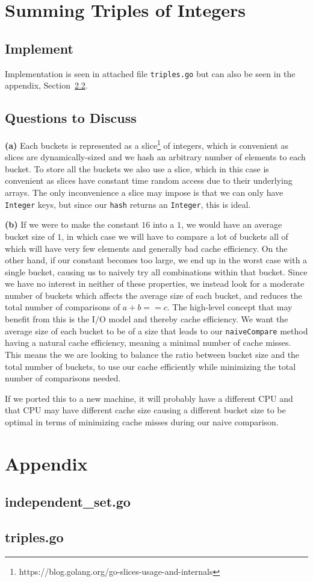 \documentclass[a5paper]{article}
\begin{document}
\section{Summing Triples of Integers}
\subsection{Implement}
Implementation is seen in attached file \texttt{triples.go} but can also be seen in the appendix, Section~\ref{sec:triples}.

\subsection{Questions to Discuss}
\textbf{(a)}
Each buckets is represented as a slice\footnote{https://blog.golang.org/go-slices-usage-and-internals} of integers, which is convenient as slices
are dynamically-sized and we hash an arbitrary number of elements to each bucket. To store all the buckets we also use a slice,
which in this case is convenient as slices have constant time random access due to their underlying arrays. The only inconvenience a slice may impose
is that we can only have \texttt{Integer} keys, but since our \texttt{hash} returns an \texttt{Integer}, this is ideal.

\textbf{(b)}
If we were to make the constant $16$ into a $1$, we would have an average bucket size of $1$, in which case we will have to compare a lot of buckets all of which will have very few elements and generally bad cache efficiency. On the other hand, if our constant becomes too large, we end up in the worst case with a single bucket, causing us to naively try all combinations within that bucket. Since we have no interest in neither of these properties, we instead look for a moderate number of buckets which affects the average size of each bucket, and reduces the total number of comparisons of $a+b==c$.
The high-level concept that may benefit from this is the I/O model and thereby cache efficiency. We want the average size of each bucket to be of a size
that leads to our \texttt{naiveCompare} method having a natural cache efficiency, meaning a minimal number of cache misses.
This means the we are looking to balance the ratio between bucket size and the total number of buckets, to use our cache efficiently while minimizing the total number of comparisons needed.

If we ported this to a new machine, it will probably have a different CPU and that CPU may have different cache size causing a different bucket size to be optimal
in terms of minimizing cache misses during our naive comparison.

\section{Appendix}
\subsection{independent\_set.go}\label{sec:indset}

\subsection{triples.go}\label{sec:triples}

\end{document}
